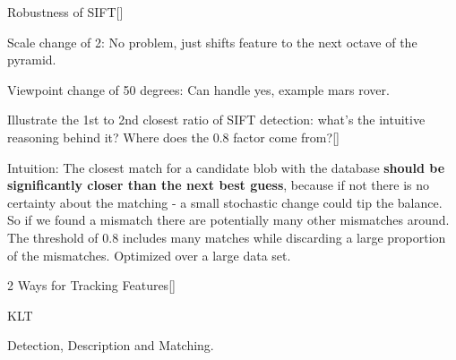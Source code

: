 \documentclass[10pt,a4paper]{scrartcl}
\begin{document}
\begin{multicols*}{2}
\begin{QandA}
{Robustness of SIFT}[\Application]
\item Scale change of 2: No problem, just shifts feature to the next octave of the pyramid.
\item Viewpoint change of 50 degrees: Can handle yes, example mars rover.
\end{QandA} 

\begin{QandA}
{Illustrate the 1st to 2nd closest ratio of SIFT detection: what’s the intuitive
reasoning behind it? Where does the 0.8 factor come from?}[\Derivation]
\item Intuition: The closest match for a candidate blob with the database \textbf{should be significantly closer than the next best guess}, because if not there is no certainty about the matching - a small stochastic change could tip the balance. So if we found a mismatch there are potentially many other mismatches around. The threshold of 0.8 includes many matches while discarding a large proportion of the mismatches. Optimized over a large data set.
\end{QandA}

\begin{QandA}{2 Ways for Tracking Features}[\Application]
\item KLT
\item Detection, Description and Matching.
\end{QandA}


\end{multicols*}
\end{document}
